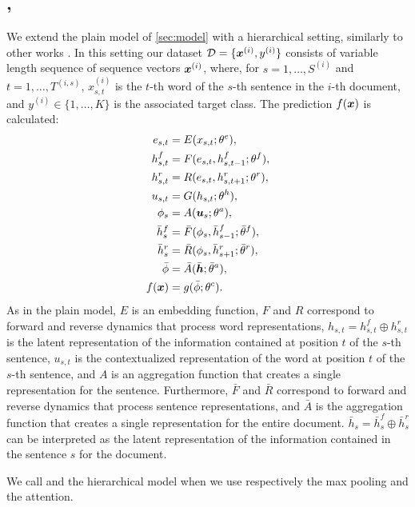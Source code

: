 \subsection{\maxh, \softmaxh}
\label{sec:modelh}
We extend the plain model of \cref{sec:model} with a hierarchical setting,
similarly to other works \cite{yang_hierarchical_2016}. In this
setting our dataset $\mathcal{D}=\{\bm{x}^{(i)},y^{(i)}\}$
consists of variable length sequence of sequence vectors
$\bm{x}^{(i)}$, where, for $s=1,\dots,S^{(i)}$ and
$t=1,\dots,T^{(i,s)}$, $x_{s,t}^{(i)}$ is the $t$-th word of the $s$-th sentence in the
$i$-th document, and $y^{(i)}\in\{1,\dots,K\}$ is the associated
target class. The prediction $f(\bm{x})$ is calculated: 
\begin{align}
  e_{s,t} &= E(x_{s,t};\theta^e),\label{eq:embedH}\\
  h^f_{s,t} &= F(e_{s,t},h^f_{s,t-1};\theta^{f}),\label{eq:maxModelRLH}\\  
  h^r_{s,t} &= R(e_{s,t},h^r_{s,t+1};\theta^{r}),\label{eq:maxModelRRH}\\
  u_{s,t} &= G(h_{s,t};\theta^{h}),\label{eq:maxModelFH}\\
  \phi_s &= A(\bm{u}_s;\theta^{a}),\label{eq:aggregationH}\\
  \bar{h}^{f}_{s} &= \bar{F}(\phi_{s},\bar{h}^{f}_{s-1};\bar{\theta}^{f}),\label{eq:maxModelRLHS}\\  
  \bar{h}^{r}_{s} &= \bar{R}(\phi_{s},\bar{h}^{r}_{s+1};\bar{\theta}^{r}),\label{eq:maxModelRRHS}\\
  \bar{\phi} &= \bar{A}(\bar{\bm{h}};\bar{\theta}^{a}),\label{eq:aggregationHS}\\
  f(\bm{x}) &= g(\bar{\phi};\theta^c).\label{eq:maxModelCH}
\end{align}
As in the plain model, $E$ is an embedding function, $F$ and $R$
correspond to forward and reverse dynamics that process word
representations,
$h_{s,t}=h_{s,t}^f\oplus h_{s,t}^r$ is the latent representation of
the information contained at position $t$ of the $s$-th sentence,
$u_{s,t}$ is the contextualized representation of the word at position
$t$ of the $s$-th sentence, and $A$ is an aggregation function that
creates a single representation for the sentence. Furthermore, $\bar{F}$ and
$\bar{R}$ correspond to 
forward and reverse dynamics that process sentence representations,
and $\bar{A}$ is the aggregation function that creates a single
representation for the entire document. $\bar{h}_s=\bar{h}^f_s\oplus \bar{h}^r_s$
can be interpreted as the
latent representation of the information contained in the sentence $s$
for the document.

We call \maxh{} and \softmaxh{} the hierarchical model when we use
respectively the max pooling and the attention.

